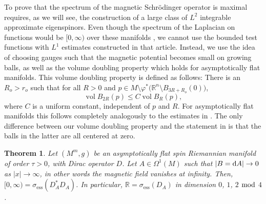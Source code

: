 \documentclass[10pt,a4paper]{amsart}
\numberwithin{equation}{section}
\newtheorem{Theorem}{Theorem}[section]
\begin{document}
To prove that the spectrum of the magnetic Schr\"odinger operator is maximal requires, as we will see, the construction of a large class of $L^2$ integrable approximate eigenspinors. Even though the spectrum of the Laplacian on functions would be $[0,\infty)$ over these manifolds \cite{ChLu2}, we cannot use the bounded test functions with $L^1$ estimates constructed in that article. Instead, we use the idea of \cite{CFKS} choosing gauges such that the magnetic potential becomes small on growing balls, as well as the volume doubling property which holds for asymptotically flat manifolds.
This volume doubling property is defined as follows: There is an $R_o>r_o$ such that for all $R>0$ and $p\in M\setminus \varphi^*\bigl({\mathbb R}^n\setminus B_{3R+R_o}(0)\bigr)$,
\begin{equation} \label{VD}
\operatorname{vol}  B_{2R}(p)\leq C \operatorname{vol}  B_{R}(p),
\end{equation}
where $C$ is a uniform constant, independent of $p$ and $R$. For asymptotically flat manifolds this follows completely analogously to the estimates in \cite[Proof of Proposition~1]{Paeng}. The only difference between our volume doubling property and the statement in \cite{Paeng} is that the balls in the latter are all centered at zero.

\begin{Theorem}\label{thm_mag_zero}
Let $(M^m,g)$ be an asymptotically flat spin Riemannian manifold of order $\tau>0$, with Dirac operator $D$. Let $A\in \Omega^1(M)$ such that $|B={\rm d}A|\to 0$ as $|x|\to \infty$, in other words the magnetic field vanishes at infinity. 	
Then, $[0,\infty) = \sigma_{\mathrm{ess}} (D_A^*D_A)$. In particular, ${\mathbb R} = \sigma_{\mathrm{ess}} (D_A)$ in dimension $0$, $1$, $2$ $\rm {mod}$ $4$.
\end{Theorem}
\end{document}
